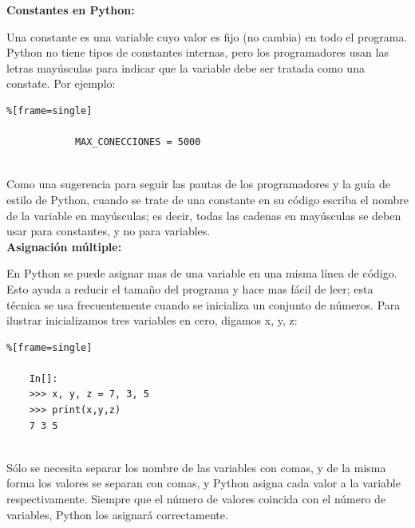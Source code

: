 {\bf Constantes en Python:}\\

Una constante es una variable cuyo valor es fijo (no cambia) en todo el programa. Python no tiene tipos de constantes internas, pero los programadores usan las letras mayúsculas para indicar que la variable debe ser tratada como una constate. Por ejemplo: 

{\ttfamily\scriptsize\scriptsize{ 	
		\begin{lstlisting}%[frame=single]
			
			MAX_CONECCIONES = 5000
			
		\end{lstlisting}
}}


Como una sugerencia para seguir las pautas de los programadores  y la guía de estilo de Python, cuando se trate de una constante en su código escriba el nombre de la variable en mayúsculas; es decir, todas las cadenas en mayúsculas se deben usar para constantes, y no para variables.\\


{\bf Asignación múltiple:}\\

En Python se puede asignar mas de una variable en una misma línea de código. Esto  ayuda a 
reducir el tamaño del programa  y hace mas fácil de leer; esta técnica se usa  frecuentemente cuando
se inicializa un conjunto de números. Para ilustrar inicializamos tres variables en cero, digamos {\ttfamily x, y,  z}: 


\begin{lstlisting}%[frame=single]
	
	In[]:	
	>>> x, y, z = 7, 3, 5
	>>> print(x,y,z)
	7 3 5
	
\end{lstlisting}Sólo se necesita separar los nombre de las  variables con comas, y  de la misma forma los valores se separan con comas, y Python asigna cada valor a la variable respectivamente. Siempre que el número de valores coincida con el número de variables, Python los asignará correctamente.









